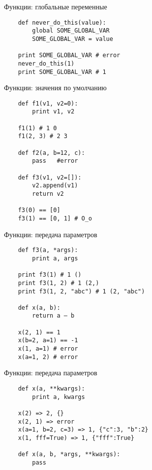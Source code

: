 \documentclass{article}
\begin{document}
\begin{center} Функции: глобальные переменные \end{center}
\vspace{15pt}
\begin{lstlisting}
    def never_do_this(value):
        global SOME_GLOBAL_VAR
        SOME_GLOBAL_VAR = value

    print SOME_GLOBAL_VAR # error
    never_do_this(1)
    print SOME_GLOBAL_VAR # 1
\end{lstlisting}
\newpage

\begin{center} Функции: значения по умолчанию \end{center}
\vspace{15pt}
\begin{lstlisting}
    def f1(v1, v2=0):
        print v1, v2

    f1(1) # 1 0
    f1(2, 3) # 2 3

    def f2(a, b=12, c):
        pass   #error

    def f3(v1, v2=[]):
        v2.append(v1)
        return v2

    f3(0) == [0]
    f3(1) == [0, 1] # O_o
\end{lstlisting}
\newpage

\begin{center} Функции: передача параметров \end{center}
\vspace{15pt}
\begin{lstlisting}
    def f3(a, *args):
        print a, args

    print f3(1) # 1 ()
    print f3(1, 2) # 1 (2,)
    print f3(1, 2, "abc") # 1 (2, "abc")

    def x(a, b):
        return a – b

    x(2, 1) == 1
    x(b=2, a=1) == -1
    x(1, a=1) # error
    x(a=1, 2) # error
\end{lstlisting}
\newpage

\begin{center} Функции: передача параметров \end{center}
\vspace{15pt}
\begin{lstlisting}
    def x(a, **kwargs):
        print a, kwargs

    x(2) => 2, {}
    x(2, 1) => error
    x(a=1, b=2, c=3) => 1, {"c":3, "b":2}
    x(1, fff=True) => 1, {"fff":True}

    def x(a, b, *args, **kwargs):
        pass
\end{lstlisting}
\newpage
\end{document}
